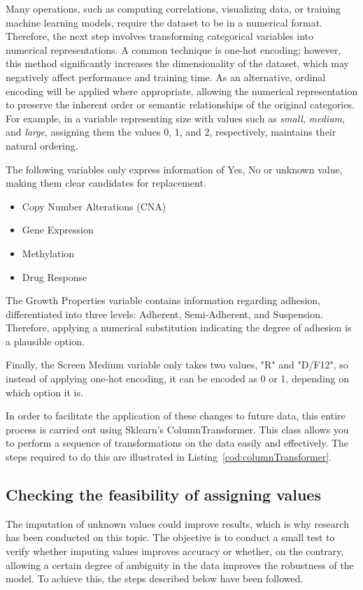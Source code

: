 Many operations, such as computing correlations, visualizing data, or training machine learning models, require the dataset to be in a numerical format. Therefore, the next step involves transforming categorical variables into numerical representations. A common technique is one-hot encoding; however, this method significantly increases the dimensionality of the dataset, which may negatively affect performance and training time. As an alternative, ordinal encoding will be applied where appropriate, allowing the numerical representation to preserve the inherent order or semantic relationships of the original categories. For example, in a variable representing size with values such as \textit{small}, \textit{medium}, and \textit{large}, assigning them the values 0, 1, and 2, respectively, maintains their natural ordering.

The following variables only express information of Yes, No or unknown value, making them clear candidates for replacement.
\begin{itemize}
    \item Copy Number Alterations (CNA)
    \item Gene Expression
    \item Methylation
    \item Drug Response
\end{itemize}

The Growth Properties variable contains information regarding adhesion, differentiated into three levels: Adherent, Semi-Adherent, and Suspension. Therefore, applying a numerical substitution indicating the degree of adhesion is a plausible option.

Finally, the Screen Medium variable only takes two values, "R" and "D/F12", so instead of applying one-hot encoding, it can be encoded as 0 or 1, depending on which option it is.

In order to facilitate the application of these changes to future data, this entire process is carried out using Sklearn's ColumnTransformer. This class allows you to perform a sequence of transformations on the data easily and effectively. The steps required to do this are illustrated in Listing~\ref{cod:columnTransformer}.

\subsection{Checking the feasibility of assigning values}

The imputation of unknown values could improve results, which is why research has been conducted on this topic. The objective is to conduct a small test to verify whether imputing values improves accuracy or whether, on the contrary, allowing a certain degree of ambiguity in the data improves the robustness of the model. To achieve this, the steps described below have been followed.

